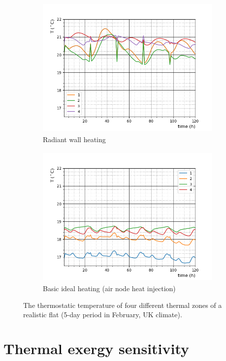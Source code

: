 \documentclass[10pt]{extarticle} %
\begin{document}


\begin{figure}[h]
 
\begin{subfigure}{0.5\textwidth}
\includegraphics[width=0.99\linewidth, height=7cm]{images/1.png} 
\caption{Radiant wall heating}
\label{fig:esprmodel}
\end{subfigure}
\begin{subfigure}{0.5\textwidth}
\includegraphics[width=0.99\linewidth, height=7cm]{images/2.png}
\caption{Basic ideal heating (air node heat injection)}
\label{fig:constructionelements}
\end{subfigure}
 
\caption{The thermostatic temperature of four different thermal zones of a realistic flat (5-day period in February, UK climate).}
\label{fig:casestudy}
\end{figure}

\section{Thermal exergy sensitivity}
\end{document}
